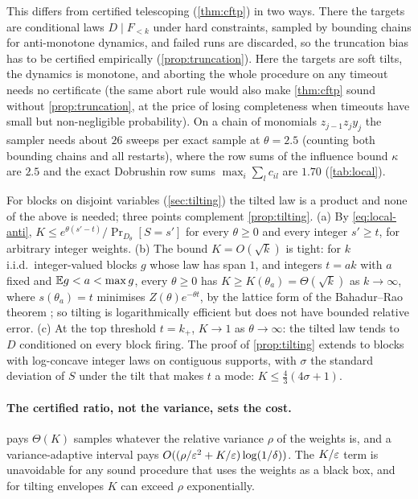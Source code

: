 This differs from certified telescoping (\cref{thm:cftp}) in two ways. There the targets
are conditional laws $D\mid F_{<k}$ under hard constraints, sampled by bounding chains
for anti-monotone dynamics, and failed runs are discarded, so the truncation bias has to
be certified empirically (\cref{prop:truncation}). Here the targets are soft tilts, the
dynamics is monotone, and aborting the whole procedure on any timeout needs no
certificate (the same abort rule would also make \cref{thm:cftp} sound without
\cref{prop:truncation}, at the price of losing completeness when timeouts have small
but non-negligible probability). On a chain of monomials $z_{j-1}z_jy_j$ the sampler
needs about $26$ sweeps per exact sample at $\theta=2.5$ (counting both bounding chains
and all restarts), where the row sums of the influence bound $\kappa$ are $2.5$ and the
exact Dobrushin row sums $\max_i\sum_lc_{il}$ are $1.70$ (\cref{tab:local}).

\begin{remark}\label{rem:local-blocks}
For blocks on disjoint variables (\cref{sec:tilting}) the tilted law is a product and
none of the above is needed; three points complement \cref{prop:tilting}. (a) By
\eqref{eq:local-anti}, $K\le e^{\theta(s'-t)}/\Pr_{D_\theta}[S=s']$ for every $\theta\ge0$
and every integer $s'\ge t$, for arbitrary integer weights. (b) The bound
$K=O(\sqrt k)$ is tight: for $k$ i.i.d.\ integer-valued blocks $g$ whose law has span
$1$, and integers $t=ak$ with $a$ fixed and $\mathbb{E} g<a<\max g$, every $\theta\ge0$ has
$K\ge K(\theta_a)=\Theta(\sqrt k)$ as $k\to\infty$, where $s(\theta_a)=t$ minimises
$Z(\theta)e^{-\theta t}$, by the lattice form of the Bahadur--Rao theorem
\cite{bahadurrao1960}; so tilting is logarithmically efficient but does not have bounded
relative error. (c) At the top
threshold $t=k_+$, $K\to1$ as $\theta\to\infty$: the tilted law tends to $D$ conditioned on
every block firing. The proof of \cref{prop:tilting} extends to blocks with log-concave
integer laws on contiguous supports, with $\sigma$ the standard deviation of $S$ under
the tilt that makes $t$ a mode: $K\le\frac43(4\sigma+1)$.
\end{remark}

\paragraph{The certified ratio, not the variance, sets the cost.}  pays
$\Theta(K)$ samples whatever the relative variance $\rho$ of the weights is, and a
variance-adaptive interval pays $O((\rho/\varepsilon^2+K/\varepsilon)\log(1/\delta))$. The $K/\varepsilon$ term
is unavoidable for any sound procedure that uses the weights as a black box, and for
tilting envelopes $K$ can exceed $\rho$ exponentially.

